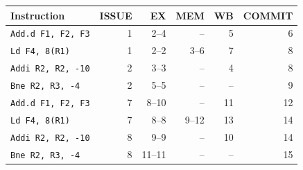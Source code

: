 \begin{tabular}{@{}lrrrrr@{}}\toprule
Instruction & ISSUE & EX & MEM & WB & COMMIT\\\midrule
\texttt{Add.d F1, F2, F3} & 1 & 2--4 & -- & 5 & 6 \\
\texttt{Ld F4, 8(R1)} & 1 & 2--2 & 3--6 & 7 & 8 \\
\texttt{Addi R2, R2, -10} & 2 & 3--3 & -- & 4 & 8 \\
\texttt{Bne R2, R3, -4} & 2 & 5--5 & -- & -- & 9 \\
\texttt{Add.d F1, F2, F3} & 7 & 8--10 & -- & 11 & 12 \\
\texttt{Ld F4, 8(R1)} & 7 & 8--8 & 9--12 & 13 & 14 \\
\texttt{Addi R2, R2, -10} & 8 & 9--9 & -- & 10 & 14 \\
\texttt{Bne R2, R3, -4} & 8 & 11--11 & -- & -- & 15 \\
\bottomrule\end{tabular}